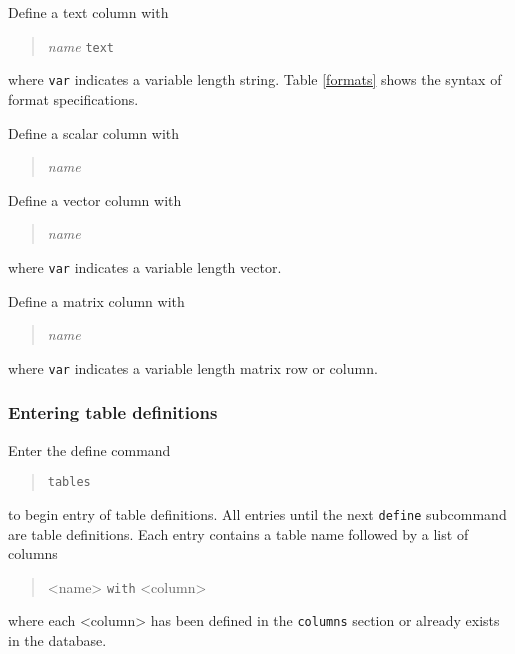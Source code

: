 \documentclass[11pt,a4paper]{report}
\begin{document}
 
Define a text column with
\begin{verse}
\emph{name}
             \verb!text!
\end{verse}
where \verb!var! indicates a variable length string.
Table \ref{formats} shows the syntax of format specifications.
 
Define a scalar column with
\begin{verse}
\emph{name}
\end{verse}

Define a vector column with
\begin{verse}  
\emph{name}
\end{verse}
where \verb!var! indicates a variable length vector.
 
Define a matrix column with
\begin{verse}
\emph{name}
            \end{verse}            
where \verb!var! indicates a variable length matrix row or column.
 
 
\subsubsection{Entering table definitions}
%
Enter the define command
\begin{verse}
\verb|tables|
\end{verse}
to begin entry of table definitions.
All entries until the next \verb!define! subcommand
are table definitions.
Each entry contains a table name followed by a list of columns
\begin{verse}
<name> \verb!with! <column> 
\end{verse}
where each <column> has been defined in the
\verb!columns! section or already exists in the database.
 
\end{document}
